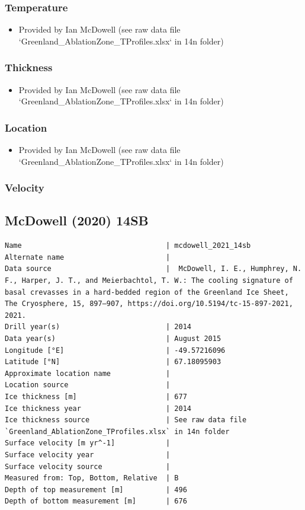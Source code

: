 \documentclass[article,a4paper,times,11pt,twoside]{article}
\begin{document}
\subsubsection{Temperature}
\label{sec:org1a9a1b7}

\begin{itemize}
\item Provided by Ian McDowell (see raw data file `Greenland\_AblationZone\_TProfiles.xlsx` in 14n folder)
\end{itemize}

\subsubsection{Thickness}
\label{sec:orgfe0f856}

\begin{itemize}
\item Provided by Ian McDowell (see raw data file `Greenland\_AblationZone\_TProfiles.xlsx` in 14n folder)
\end{itemize}

\subsubsection{Location}
\label{sec:orgec8652b}

\begin{itemize}
\item Provided by Ian McDowell (see raw data file `Greenland\_AblationZone\_TProfiles.xlsx` in 14n folder)
\end{itemize}

\subsubsection{Velocity}
\label{sec:org4720704}
\clearpage
\subsection{McDowell (2020) 14SB}
\label{sec:orgc7f87c7}
\begin{verbatim}
Name                                  | mcdowell_2021_14sb
Alternate name                        | 
Data source                           |  McDowell, I. E., Humphrey, N. F., Harper, J. T., and Meierbachtol, T. W.: The cooling signature of basal crevasses in a hard-bedded region of the Greenland Ice Sheet, The Cryosphere, 15, 897–907, https://doi.org/10.5194/tc-15-897-2021, 2021.
Drill year(s)                         | 2014
Data year(s)                          | August 2015
Longitude [°E]                        | -49.57216096
Latitude [°N]                         | 67.18095903
Approximate location name             | 
Location source                       | 
Ice thickness [m]                     | 677
Ice thickness year                    | 2014
Ice thickness source                  | See raw data file `Greenland_AblationZone_TProfiles.xlsx` in 14n folder
Surface velocity [m yr^-1]            | 
Surface velocity year                 | 
Surface velocity source               | 
Measured from: Top, Bottom, Relative  | B
Depth of top measurement [m]          | 496
Depth of bottom measurement [m]       | 676
\end{verbatim}
\end{document}
